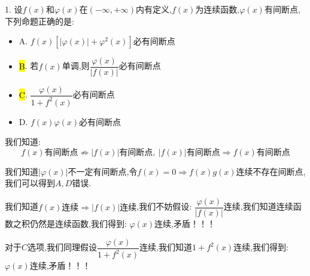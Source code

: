 1. 设$f(x)$和$\varphi(x)$在$(-\infty,+\infty)$内有定义,$f(x)$为连续函数,$\varphi(x)$有间断点,下列命题正确的是: 
\begin{itemize}
	\item A. $f(x)[|\varphi(x)|+\varphi^2(x)]$必有间断点
	\item \hl{B}. 若$f(x)$单调,则$\dfrac{\varphi(x)}{|f(x)|}$必有间断点
	\item \hl{C}. $\dfrac{\varphi(x)}{1+f^2(x)}$必有间断点
	\item D. $f(x)\varphi(x)$必有间断点
\end{itemize}
\begin{solution}
	
	我们知道: 
	$$f(x)\text{有间断点}\nRightarrow |f(x)|\text{有间断点},\ |f(x)|\text{有间断点}\Rightarrow f(x)\text{有间断点}$$
	
	我们知道$|\varphi(x)|$不一定有间断点,令$f(x)=0\Rightarrow f(x)g(x)$连续不存在间断点,我们可以得到$A, D$错误.
	
	我们知道$f(x)\text{连续}\Rightarrow |f(x)|\text{连续}$,我们不妨假设: $\dfrac{\varphi(x)}{|f(x)|}$连续,我们知道连续函数之积仍然是连续函数,我们得到: $\varphi(x)$连续,矛盾！！！
	
	对于$C$选项,我们同理假设$\dfrac{\varphi(x)}{1+f^2(x)}$连续,我们知道$1+f^{2}(x)$连续,我们得到: $\varphi(x)$连续,矛盾！！！
	
\end{solution}

